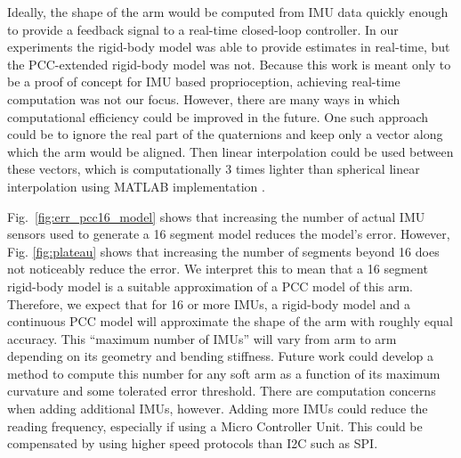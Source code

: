 Ideally, the shape of the arm would be computed from IMU data quickly enough to provide a feedback signal to a real-time closed-loop controller.
In our experiments the rigid-body model was able to provide estimates in real-time, but the PCC-extended rigid-body model was not.
Because this work is meant only to be a proof of concept for IMU based proprioception, achieving real-time computation was not our focus.
However, there are many ways in which computational efficiency could be improved in the future.
One such approach could be to ignore the real part of the quaternions and keep only a vector along which the arm would be aligned. 
Then linear interpolation could be used between these vectors, which is computationally 3 times lighter than spherical linear interpolation using MATLAB implementation \cite{matlab}. 



Fig.~\ref{fig:err_pcc16_model} shows that increasing the number of actual IMU sensors used to generate a 16 segment model reduces the model's error. However, Fig. \ref{fig:plateau} shows that increasing the number of segments beyond 16 does not noticeably reduce the error. We interpret this to mean that a 16 segment rigid-body model is a suitable approximation of a PCC model of this arm.
Therefore, we expect that for 16 or more IMUs, a rigid-body model and a continuous PCC model will approximate the shape of the arm with roughly equal accuracy.
This ``maximum number of IMUs'' will vary from arm to arm depending on its geometry and bending stiffness.
Future work could develop a method to compute this number for any soft arm as a function of its maximum curvature and some tolerated error threshold.
There are computation concerns when adding additional IMUs, however. Adding more IMUs could reduce the reading frequency, especially if using a Micro Controller Unit. This could be compensated by using higher speed protocols than I2C such as SPI.







